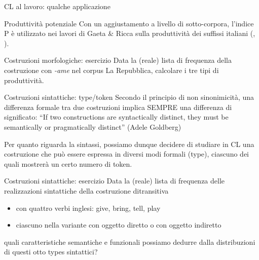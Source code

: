 \documentclass[pdf]{prosper}
\begin{document}
\begin{tsectionandpart}{CL al lavoro: qualche applicazione}
\begin{slide}{Produttività potenziale}
Con un aggiustamento a livello di sotto-corpora, l'indice P è utilizzato nei lavori di Gaeta \& Ricca sulla produttività dei suffissi italiani (\citealt{GaetaRicca2003}, \citealt{GaetaRicca2006}).
\end{slide}

\begin{slide}{Costruzioni morfologiche: esercizio}
Data la (reale) lista di frequenza della costruzione con {\it -ame} nel corpus La Repubblica, calcolare i tre tipi di produttività.

\end{slide}

\begin{slide}{Costruzioni sintattiche: type/token}
Secondo il principio di non sinonimicità, una differenza formale tra due costruzioni implica SEMPRE una differenza di significato: ``If two constructions are syntactically distinct, they must be semantically or pragmatically distinct'' (Adele Goldberg)

Per quanto riguarda la sintassi, possiamo dunque decidere di studiare in CL una costruzione che può essere espressa in diversi modi formali (type), ciascuno dei quali mostrerà un certo numero di token.

\end{slide}


\begin{slide}{Costruzioni sintattiche: esercizio}
Data la (reale) lista di frequenza delle realizzazioni sintattiche della costruzione ditransitiva 
	
	\begin{itemize}
		\item con quattro verbi inglesi: give, bring, tell, play
		\item ciascuno nella variante con oggetto diretto o con oggetto indiretto
	\end{itemize}

quali caratteristiche semantiche e funzionali possiamo dedurre dalla distribuzioni di questi otto types sintattici?

\end{slide}
\end{tsectionandpart}
\end{document}

